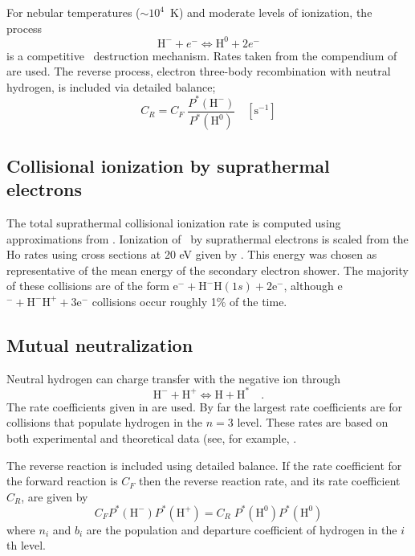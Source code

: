 For nebular temperatures ($\sim10^4$~K) and moderate levels of ionization,
the process
\begin{equation}
{{\mathrm{H}}^ - } + {e^ - } \Leftrightarrow {{\mathrm{H}}^0} + 2{e^ - }
\end{equation}
is a competitive \hminus\ destruction mechanism.  Rates taken from the compendium
of \citet{Janev1987} are used.  The reverse process, electron three-body
recombination with neutral hydrogen, is included via detailed balance;
\begin{equation}
{C_R} = {C_F}\;\frac{{{P^*}({{\mathrm{H}}^ - })}}{{{P^*}({{\mathrm{H}}^0})}}
\quad [\mathrm{s}^{-1}]
\end{equation}

\subsection{Collisional ionization by suprathermal electrons}

The total suprathermal collisional ionization rate is computed using
approximations from \citet{Shull1985}.  Ionization of \hminus\ by
suprathermal electrons is scaled from the Ho rates using cross sections
at 20 eV given by \citet{Janev1987}.  This energy was chosen as
representative of the mean energy of the secondary electron shower.  The
majority of these collisions are of the form e$^- + \mathrm{H}^- \mathrm{H}(1s) +
2\mathrm{e}^-$, although
e$^- + \mathrm{H}^-  \mathrm{H}^+ + 3\mathrm{e}^-$ collisions occur roughly 1\% of the time.

\subsection{Mutual neutralization}

Neutral hydrogen can charge transfer with the negative ion through
\begin{equation}
{{\mathrm{H}}^ - } + {{\mathrm{H}}^ + } \Leftrightarrow {\mathrm{H}} +
{{\mathrm{H}}^*}\quad .
\end{equation}
The rate coefficients given in \citet{Janev1987} are used.  By far the
largest rate coefficients are for collisions that populate hydrogen in the
$n=3$ level.  These rates are based on both experimental and theoretical data
(see, for example, \citet{Peart1985}.

The reverse reaction is included using detailed balance.  If the rate
coefficient for the forward reaction is $C_F$ then the reverse reaction rate,
and its rate coefficient $C_R$, are given by
\begin{equation}
{C_F}{P^*}({{\mathrm{H}}^ - }){P^*}({{\mathrm{H}}^ + }) =
{C_R}\;{P^*}({{\mathrm{H}}^0}){P^*}({{\mathrm{H}}^0})
\end{equation}
where $n_i$ and $b_i$ are the population and departure coefficient of hydrogen
in the $i$th level.

